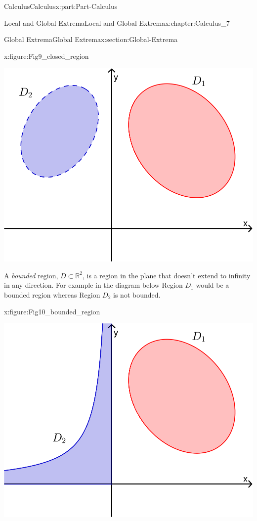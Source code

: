 \documentclass[oneside,10pt,]{book}
\numberwithin{equation}{section}
\begin{document}
\begin{partptx}{Calculus}{}{Calculus}{}{}{x:part:Part-Calculus}
\begin{chapterptx}{Local and Global Extrema}{}{Local and Global Extrema}{}{}{x:chapter:Calculus_7}
\begin{sectionptx}{Global Extrema}{}{Global Extrema}{}{}{x:section:Global-Extrema}
\begin{figureptx}{}{x:figure:Fig9_closed_region}{}
\begin{image}{0.275}{0.45}{0.275}
\includegraphics[width=\linewidth]{./Calculus/Images/7/Fig9_closed_region.png}
\end{image}%
\tcblower
\end{figureptx}%
A \emph{bounded} region, \(D \subset \mathbb{R}^2\), is a region in the plane that doesn’t extend to infinity in any direction. For example in the diagram below Region \(D_1\) would be a bounded region whereas Region \(D_2\) is not bounded.%
\begin{figureptx}{}{x:figure:Fig10_bounded_region}{}%
\begin{image}{0.275}{0.45}{0.275}%
\includegraphics[width=\linewidth]{./Calculus/Images/7/Fig10_bounded_region.png}

\end{image}
\end{figureptx}
\end{sectionptx}
\end{chapterptx}
\end{partptx}
\end{document}
